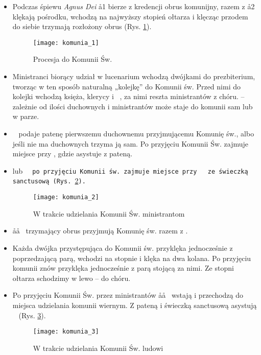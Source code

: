 \begin{itemize}
	\item Podczas śpiewu \textit{Agnus Dei} \aa1 bierze z kredencji obrus
	      komunijny, razem z \aa2 klękają pośrodku, wchodzą na najwyższy stopień
	      ołtarza i klęcząc przodem do siebie trzymają rozłożony obrus (Rys.
	      \ref{fig:komunia_1}).

	      \begin{figure}[h]
		      \centering
		      \texttt{[image: komunia\_1]}
		      \caption{Procesja do Komunii Św.}
		      \label{fig:komunia_1}
	      \end{figure}

	\item Ministranci biorący udział w lucenarium wchodzą dwójkami do
	      prezbiterium, tworząc w ten sposób naturalną „kolejkę” do Komunii św.
	      Przed nimi do kolejki wchodzą księża, klerycy i \cc~, za nimi reszta
	      ministrantów z chóru.  – zależnie od ilości duchownych i
	      ministrantów może staje do komunii sam lub w parze.
	\item \cc~ podaje patenę pierwszemu duchownemu przyjmującemu Komunię św.,
	      albo jeśli nie ma duchownych trzyma ją sam. Po przyjęciu Komunii Św.
	      zajmuje miejsce przy \ii, gdzie asystuje z pateną.
	\item {} lub \tt~ po przyjęciu Komunii św. zajmuje miejsce przy \ii~ ze
	      świeczką sanctusową (Rys. \ref{fig:komunia_2}).

	      \begin{figure}[h]
		      \centering
		      \texttt{[image: komunia\_2]}
		      \caption{W trakcie udzielania Komunii Św. ministrantom}
		      \label{fig:komunia_2}
	      \end{figure}

	\item \aa\aa~ trzymający obrus przyjmują Komunię św. razem z .
	\item Każda dwójka przystępująca do Komunii św. przyklęka jednocześnie z
	      poprzedzającą parą, wchodzi na stopnie i klęka na dwa kolana. Po
	      przyjęciu komunii znów przyklęka jednocześnie z parą stojącą za nimi.
	      Ze stopni ołtarza schodzimy w lewo – do chóru.
	\item Po przyjęciu Komunii Św. przez ministrantów \aa\aa~ wstają i
	      przechodzą do miejsca udzielania komunii wiernym. Z pateną i świeczką
	      sanctusową asystują \cc\cc~ (Rys. \ref{fig:komunia_3}).

	      \begin{figure}[h]
		      \centering
		      \texttt{[image: komunia\_3]}
		      \caption{W trakcie udzielania Komunii Św. ludowi}
		      \label{fig:komunia_3}
	      \end{figure}

\end{itemize}

